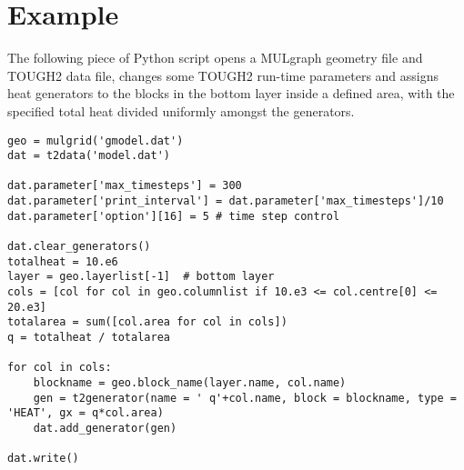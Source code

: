 \section{Example}

The following piece of Python script opens a MULgraph geometry file and TOUGH2 data file, changes some TOUGH2 run-time parameters and assigns heat generators to the blocks in the bottom layer inside a defined area, with the specified total heat divided uniformly amongst the generators.

\begin{lstlisting}
geo = mulgrid('gmodel.dat')
dat = t2data('model.dat')

dat.parameter['max_timesteps'] = 300
dat.parameter['print_interval'] = dat.parameter['max_timesteps']/10
dat.parameter['option'][16] = 5 # time step control

dat.clear_generators()
totalheat = 10.e6
layer = geo.layerlist[-1]  # bottom layer
cols = [col for col in geo.columnlist if 10.e3 <= col.centre[0] <= 20.e3]
totalarea = sum([col.area for col in cols])
q = totalheat / totalarea

for col in cols:
    blockname = geo.block_name(layer.name, col.name)
    gen = t2generator(name = ' q'+col.name, block = blockname, type = 'HEAT', gx = q*col.area)
    dat.add_generator(gen)

dat.write()

\end{lstlisting}

